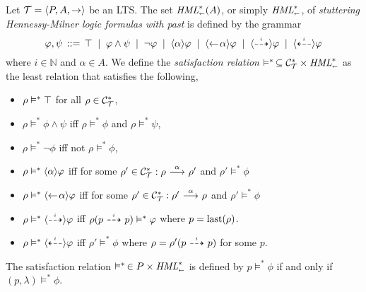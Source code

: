 \begin{definition}
    \label{dfn:hmlpast}
    Let $\mathcal{T}=\langle P,A,\rightarrow \rangle$ be an LTS. The set $\textit{HML}_\shortleftarrow^*(A)$,
    or simply $\textit{HML}_\shortleftarrow^*$, of
    \emph{stuttering Hennessy-Milner logic formulas with past}
    is defined by the grammar
    \[
        \varphi,\psi \,::=\, \top \;\;|\;\; \varphi\land\psi
                                \;\;|\;\; \neg\varphi
                                \;\;|\;\; \mbox{\ensuremath{\langle \alpha \rangle}} \varphi
                                \;\;|\;\; \mbox{\ensuremath{\langle\leftarrow\! \alpha \rangle}} \varphi
                                \;\;|\;\; \mbox{\ensuremath{\langle\stackrel{_{i}}{\dashrightarrow}\rangle}} \varphi
                                \;\;|\;\; \mbox{\ensuremath{\langle\stackrel{_{i}}{\dashleftarrow}\rangle}} \varphi
    \]
    where $i\in\mathbb{N}$ and $\alpha\in A$.
    We define the \emph{satisfaction relation} $\vDash^*\,\subseteq \mathcal{C}_{\mathcal{T}}^* \times \textit{HML}_\shortleftarrow^*$
    as the least relation that satisfies the following,
    \begin{itemize}
        \item $\rho\vDash^*\top$ for all $\rho\in\mathcal{C}_{\mathcal{T}}^*$,
        \item $\rho\vDash^*\phi\land\psi$ iff $\rho\vDash^*\phi$ and $\rho\vDash^*\psi$,
        \item $\rho\vDash^*\neg\phi$ iff not $\rho\vDash^*\phi$,
        \item $\rho\vDash^*\mbox{\ensuremath{\langle \alpha \rangle}}\varphi$ iff for some
              $\rho'\in\mathcal{C}_{\mathcal{T}}^* : \rho\ {\stackrel{{\alpha}}{\longrightarrow}}\ \rho'$ and $\rho'\vDash^*\phi$
        \item $\rho\vDash^*\mbox{\ensuremath{\langle\leftarrow\! \alpha \rangle}}\varphi$ iff for some
              $\rho'\in\mathcal{C}_{\mathcal{T}}^* : \rho'\ {\stackrel{{\alpha}}{\longrightarrow}}\ \rho$ and $\rho'\vDash^*\phi$
        \item $\rho\vDash^*\mbox{\ensuremath{\langle\stackrel{_{i}}{\dashrightarrow}\rangle}}\varphi$ iff
              $\rho(p\ {\stackrel{_{i}}{\dashrightarrow}}\  p) \vDash^* \varphi$ where $p=\operatorname{last}(\rho)$.
        \item $\rho\vDash^*\mbox{\ensuremath{\langle\stackrel{_{i}}{\dashleftarrow}\rangle}}\varphi$ iff
              $\rho' \vDash^* \phi$ where $\rho = \rho'(p \ {\stackrel{_{i}}{\dashrightarrow}}\  p)$ for some $p$.
    \end{itemize}
    The satisfaction relation $\vDash^*\,\in P\times\textit{HML}_\shortleftarrow^*$ is defined by
    $p\vDash^*\phi$ if and only if $(p,\lambda)\vDash^* \phi$.
\end{definition}

